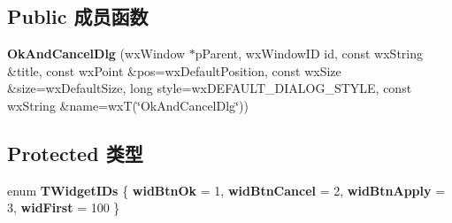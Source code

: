 \subsection*{Public 成员函数}
\begin{DoxyCompactItemize}
\item 
\hypertarget{class_ok_and_cancel_dlg_a65b3ff0d164b394b96b0f1c0e54d0652}{{\bfseries Ok\+And\+Cancel\+Dlg} (wx\+Window $\ast$p\+Parent, wx\+Window\+I\+D id, const wx\+String \&title, const wx\+Point \&pos=wx\+Default\+Position, const wx\+Size \&size=wx\+Default\+Size, long style=wx\+D\+E\+F\+A\+U\+L\+T\+\_\+\+D\+I\+A\+L\+O\+G\+\_\+\+S\+T\+Y\+L\+E, const wx\+String \&name=wx\+T(\char`\"{}Ok\+And\+Cancel\+Dlg\char`\"{}))}\label{class_ok_and_cancel_dlg_a65b3ff0d164b394b96b0f1c0e54d0652}

\end{DoxyCompactItemize}
\subsection*{Protected 类型}
\begin{DoxyCompactItemize}
\item 
\hypertarget{class_ok_and_cancel_dlg_a8d29418b15504491b4af785b1e85a2a5}{enum {\bfseries T\+Widget\+I\+Ds} \{ {\bfseries wid\+Btn\+Ok} = 1, 
{\bfseries wid\+Btn\+Cancel} = 2, 
{\bfseries wid\+Btn\+Apply} = 3, 
{\bfseries wid\+First} = 100
 \}}\label{class_ok_and_cancel_dlg_a8d29418b15504491b4af785b1e85a2a5}

\end{DoxyCompactItemize}
